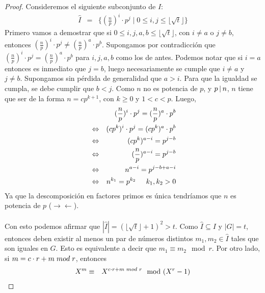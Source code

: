 \documentclass[10pt]{article}
\newcommand{\0}{\mathbf{0}}
\newcommand{\1}{\mathbf{1}}
\newcommand{\divi}{\hspace{1.8pt}|\hspace{1.8pt}}
\newcommand{\modulox}{\mod (X^r-1)}
\newcommand{\modl}{\mod}
\newcommand{\+}{\oplus}
\theoremstyle{remark}
\theoremstyle{remark}
\newcommand{\tq}{\mid}
\begin{document}
	\begin{proof}
		Consideremos el siguiente subconjunto de $I$:
		\begin{eqnarray}
			\hat{I} &=&\{(\frac{n}{p})^{i}\cdot p^{j}\tq 0\leq i,j\leq \lfloor \sqrt{t}\rfloor\}\nonumber 
		\end{eqnarray}
		Primero vamos a demostrar que si $0\leq i,j,a,b\leq \lfloor \sqrt{t}\rfloor$, con $i\neq a$ o $j\neq b$, entonces $(\frac{n}{p})^{i}\cdot p^{j} \neq (\frac{n}{p})^{a}\cdot p^{b}$. Supongamos por contradicción que $(\frac{n}{p})^{i}\cdot p^{j} = (\frac{n}{p})^{a}\cdot p^{b}$ para $i,j,a,b$ como los de antes. Podemos notar que si $i=a$ entonces es inmediato que $j=b$, luego necesariamente se cumple que $i\neq a$ y $j\neq b$. Supongamos sin pérdida de generalidad que $a>i$. Para que la igualdad se cumpla, se debe cumplir que $b<j$. Como $n$ no es potencia de $p$, y $p\divi  n$, $n$ tiene que ser de la forma $n=cp^{k+1}$, con $k\geq 0$ y $1<c<p$. Luego,
		\begin{eqnarray}
			& &(\frac{n}{p})^{i}\cdot p^{j} = (\frac{n}{p})^{a}\cdot p^{b}\nonumber\\
			&\Leftrightarrow &(cp^k)^{i}\cdot p^{j} = (cp^k)^{a}\cdot p^{b}\nonumber\\
			&\Leftrightarrow &(cp^k)^{a-i} = p^{j-b}\nonumber\\
			&\Leftrightarrow &(\frac{n}{p})^{a-i} = p^{j-b}\nonumber\\
			&\Leftrightarrow &n^{a-i} = p^{j-b+a-i}\nonumber\\
			&\Leftrightarrow &n^{k_1} = p^{k_2}\hspace{0.5cm}k_1,k_2>0\nonumber
		\end{eqnarray}
		Ya que la descomposición en factores primos es única tendrí­amos que $n$ es potencia de $p$ ($\rightarrow\leftarrow$).\\\\
		Con esto podemos afirmar que $|\hat{I}|=(\lfloor \sqrt{t}\rfloor+1)^2>t$. Como $\hat{I}\subseteq I$ y $|G|=t$, entonces deben existir al menos un par de números distintos $m_1,m_2\in \hat{I}$ tales que son iguales en $G$. Esto es equivalente a decir que $m_1\equiv m_2 \modl r$. Por otro lado, si $m=c\cdot r + m\hspace{0.1cm}mod\hspace{0.1cm} r$, entonces 
		\begin{eqnarray}
			X^m &\equiv &	X^{c\cdot r + m\hspace{0.1cm}mod\hspace{0.1cm} r} \modulox\nonumber\\

\end{eqnarray}
\end{proof}
\end{document}
